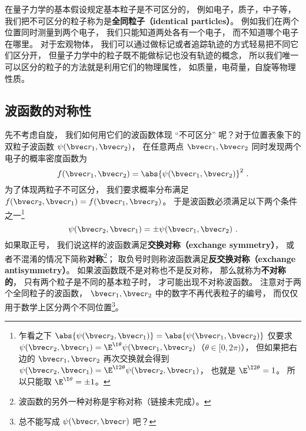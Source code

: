 

在量子力学的基本假设规定基本粒子是不可区分的， 例如电子，质子，中子等， 我们把不可区分的粒子称为是\textbf{全同粒子（identical particles）}。 例如我们在两个位置同时测量到两个电子， 我们只能知道两处各有一个电子， 而不知道哪个电子在哪里。 对于宏观物体， 我们可以通过做标记或者追踪轨迹的方式轻易把不同它们区分开， 但量子力学中的粒子既不能做标记也没有轨迹的概念， 所以我们唯一可以区分的粒子的方法就是利用它们的物理属性， 如质量，电荷量，自旋等物理性质。

\subsection{波函数的对称性}
先不考虑自旋， 我们如何用它们的波函数体现 “不可区分” 呢？对于位置表象下的双粒子波函数 $\psi(\bvec r_1, \bvec r_2)$， 在任意两点 $\bvec r_1, \bvec r_2$ 同时发现两个电子的概率密度函数为%
\begin{equation}
f(\bvec r_1, \bvec r_2) = \abs{\psi(\bvec r_1, \bvec r_2)}^2~.
\end{equation}
为了体现两粒子不可区分， 我们要求概率分布满足 $f(\bvec r_2, \bvec r_1) = f(\bvec r_1, \bvec r_2)$。 于是波函数必须满足以下两个条件之一\footnote{乍看之下 $\abs{\psi(\bvec r_2, \bvec r_1)} = \abs{\psi(\bvec r_1, \bvec r_2)}$ 仅要求 $\psi(\bvec r_2, \bvec r_1) = \E^{\I \theta} \psi(\bvec r_1, \bvec r_2)$（$\theta \in [0, 2\pi)$）， 但如果把右边的 $\bvec r_1, \bvec r_2$ 再次交换就会得到 $\psi(\bvec r_2, \bvec r_1) = \E^{\I 2\theta} \psi(\bvec r_2, \bvec r_1)$， 也就是 $\E^{\I2\theta} = 1$。 所以只能取 $\E^{\I\theta} = \pm 1$。}
\begin{equation}\label{eq_IdPar_5}
\psi(\bvec r_2, \bvec r_1) = \pm \psi(\bvec r_1, \bvec r_2)~.
\end{equation}
如果取正号， 我们说这样的波函数满足\textbf{交换对称（exchange symmetry）}， 或者不混淆的情况下简称\textbf{对称}\footnote{波函数的另外一种对称是宇称对称（链接未完成）。}； 取负号时则称波函数满足\textbf{反交换对称（exchange antisymmetry）}。 如果波函数既不是对称也不是反对称， 那么就称为\textbf{不对称的}， 只有两个粒子是不同的基本粒子时， 才可能出现不对称波函数。 注意对于两个全同粒子的波函数， $\bvec r_1, \bvec r_2$ 中的数字不再代表粒子的编号， 而仅仅用于数学上区分两个不同位置\footnote{总不能写成 $\psi(\bvec r, \bvec r)$ 吧？}。

